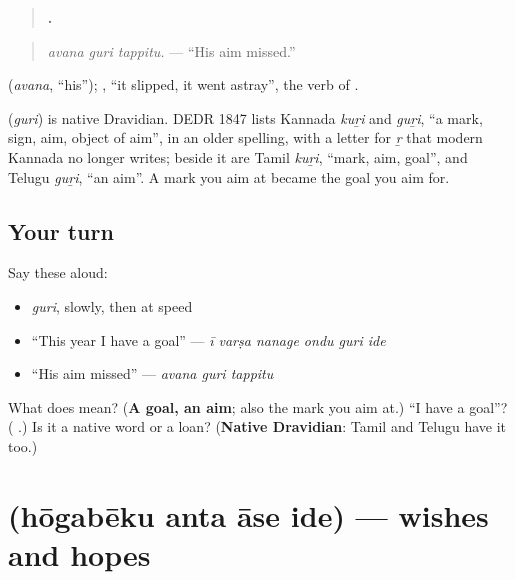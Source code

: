 \begin{quote}
\textbf{  .}
\end{quote}

\begin{quote}
\emph{avana guri tappitu.} — \textquotedblleft{}His aim missed.\textquotedblright{}
\end{quote}

\textbf{} (\emph{avana}, \textquotedblleft{}his\textquotedblright{}); \textbf{}, \textquotedblleft{}it slipped, it went astray\textquotedblright{}, the verb of \textbf{ }.

\begin{cousinweb}
\textbf{} (\emph{guri}) is native Dravidian. DEDR 1847 lists Kannada \emph{kuṟi} and \emph{guṟi}, \textquotedblleft{}a mark, sign, aim, object of aim\textquotedblright{}, in an older spelling, with a letter for \emph{ṟ} that modern Kannada no longer writes; beside it are Tamil \emph{kuṟi}, \textquotedblleft{}mark, aim, goal\textquotedblright{}, and Telugu \emph{guṟi}, \textquotedblleft{}an aim\textquotedblright{}. A mark you aim at became the goal you aim for.
\end{cousinweb}

\subsection*{Your turn}
Say these aloud:

\begin{itemize}
\raggedright
  \item \emph{guri}, slowly, then at speed
  \item \textquotedblleft{}This year I have a goal\textquotedblright{} — \emph{ī varṣa nanage ondu guri ide}
  \item \textquotedblleft{}His aim missed\textquotedblright{} — \emph{avana guri tappitu}
\end{itemize}

\begin{tcolorbox}[breakable,colback=teal!4,colframe=teal!35!black,title={Before you move on}]
What does \textbf{} mean? (\textbf{A goal, an aim}; also the mark you aim at.) \textquotedblleft{}I have a goal\textquotedblright{}? (\textbf{   }.) Is it a native word or a loan? (\textbf{Native Dravidian}: Tamil and Telugu have it too.)
\end{tcolorbox}
\section[\texorpdfstring{\kn{ಹೋಗಬೇಕು} \kn{ಅಂತ} \kn{ಆಸೆ} \kn{ಇದೆ} (hōgabēku anta …)}{ಹೋಗಬೇಕು ಅಂತ ಆಸೆ ಇದೆ (hōgabēku anta …)}]{    (hōgabēku anta āse ide) — wishes and hopes}

